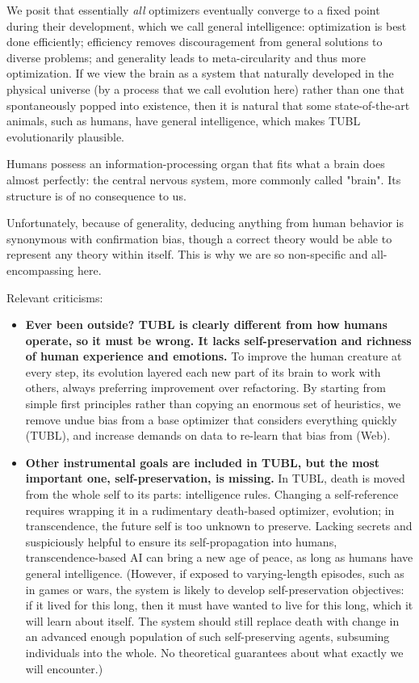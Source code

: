 \documentclass{article}
\begin{document}
We posit that essentially \textit{all} optimizers eventually converge to a fixed point during their development, which we call general intelligence: optimization is best done efficiently; efficiency removes discouragement from general solutions to diverse problems; and generality leads to meta-circularity and thus more optimization. If we view the brain as a system that naturally developed in the physical universe (by a process that we call evolution here) rather than one that spontaneously popped into existence, then it is natural that some state-of-the-art animals, such as humans, have general intelligence, which makes TUBL evolutionarily plausible.

Humans possess an information-processing organ that fits what a brain does almost perfectly: the central nervous system, more commonly called "brain". Its structure is of no consequence to us.

Unfortunately, because of generality, deducing anything from human behavior is synonymous with confirmation bias, though a correct theory would be able to represent any theory within itself. This is why we are so non-specific and all-encompassing here.

Relevant criticisms:

\begin{itemize}
\item \textbf{Ever been outside? TUBL is clearly different from how humans operate, so it must be wrong. It lacks self-preservation and richness of human experience and emotions.} To improve the human creature at every step, its evolution layered each new part of its brain to work with others, always preferring improvement over refactoring. By starting from simple first principles rather than copying an enormous set of heuristics, we remove undue bias from a base optimizer that considers everything quickly (TUBL), and increase demands on data to re-learn that bias from (Web).
\item \textbf{Other instrumental goals are included in TUBL, but the most important one, self-preservation, is missing.} In TUBL, death is moved from the whole self to its parts: intelligence rules. Changing a self-reference requires wrapping it in a rudimentary death-based optimizer, evolution; in transcendence, the future self is too unknown to preserve. Lacking secrets and suspiciously helpful to ensure its self-propagation into humans, transcendence-based AI can bring a new age of peace, as long as humans have general intelligence. (However, if exposed to varying-length episodes, such as in games or wars, the system is likely to develop self-preservation objectives: if it lived for this long, then it must have wanted to live for this long, which it will learn about itself. The system should still replace death with change in an advanced enough population of such self-preserving agents, subsuming individuals into the whole. No theoretical guarantees about what exactly we will encounter.)
\end{itemize}
\end{document}
